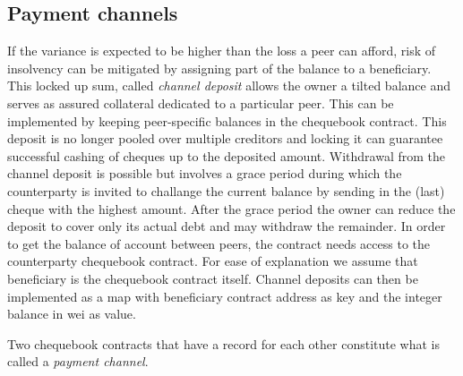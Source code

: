 \documentclass[a4paper,10pt]{article}
\newcommand\gloss[1]{\emph{\gls{#1}}}
\begin{document}
\subsection{Payment channels}

If the variance is expected to be higher than the loss a peer can afford,
risk of insolvency can be mitigated by assigning part of the balance to a beneficiary.
This locked up sum, called \gloss{channel deposit} allows the owner a tilted balance and
serves as assured collateral dedicated to a particular peer.
This can be implemented by keeping peer-specific balances in the chequebook contract.
This deposit is no longer pooled over multiple creditors
and locking it can guarantee successful cashing of cheques up to the deposited amount.
Withdrawal from the channel deposit is possible but involves a grace period during which
the counterparty is invited to challange the current balance by sending in the (last) cheque
with the highest amount. After the grace period the owner can reduce the deposit to cover only
its actual debt and may withdraw the remainder.
In order to get the balance of account between peers, the contract needs access to the counterparty
chequebook contract. For ease of explanation we assume that beneficiary is the
chequebook contract itself. Channel deposits can then be implemented as a map with beneficiary contract
address as key and the integer balance in wei as value.

Two chequebook contracts that have a record for each other constitute what is
called a \gloss{payment channel}.
\end{document}
